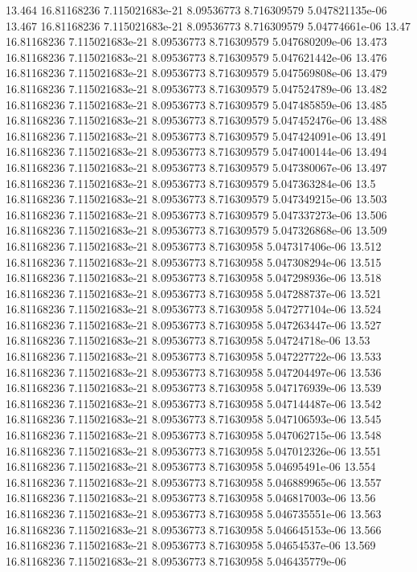 {13.464 16.81168236 7.115021683e-21 8.09536773 8.716309579 5.047821135e-06
13.467 16.81168236 7.115021683e-21 8.09536773 8.716309579 5.04774661e-06
13.47 16.81168236 7.115021683e-21 8.09536773 8.716309579 5.047680209e-06
13.473 16.81168236 7.115021683e-21 8.09536773 8.716309579 5.047621442e-06
13.476 16.81168236 7.115021683e-21 8.09536773 8.716309579 5.047569808e-06
13.479 16.81168236 7.115021683e-21 8.09536773 8.716309579 5.047524789e-06
13.482 16.81168236 7.115021683e-21 8.09536773 8.716309579 5.047485859e-06
13.485 16.81168236 7.115021683e-21 8.09536773 8.716309579 5.047452476e-06
13.488 16.81168236 7.115021683e-21 8.09536773 8.716309579 5.047424091e-06
13.491 16.81168236 7.115021683e-21 8.09536773 8.716309579 5.047400144e-06
13.494 16.81168236 7.115021683e-21 8.09536773 8.716309579 5.047380067e-06
13.497 16.81168236 7.115021683e-21 8.09536773 8.716309579 5.047363284e-06
13.5 16.81168236 7.115021683e-21 8.09536773 8.716309579 5.047349215e-06
13.503 16.81168236 7.115021683e-21 8.09536773 8.716309579 5.047337273e-06
13.506 16.81168236 7.115021683e-21 8.09536773 8.716309579 5.047326868e-06
13.509 16.81168236 7.115021683e-21 8.09536773 8.71630958 5.047317406e-06
13.512 16.81168236 7.115021683e-21 8.09536773 8.71630958 5.047308294e-06
13.515 16.81168236 7.115021683e-21 8.09536773 8.71630958 5.047298936e-06
13.518 16.81168236 7.115021683e-21 8.09536773 8.71630958 5.047288737e-06
13.521 16.81168236 7.115021683e-21 8.09536773 8.71630958 5.047277104e-06
13.524 16.81168236 7.115021683e-21 8.09536773 8.71630958 5.047263447e-06
13.527 16.81168236 7.115021683e-21 8.09536773 8.71630958 5.04724718e-06
13.53 16.81168236 7.115021683e-21 8.09536773 8.71630958 5.047227722e-06
13.533 16.81168236 7.115021683e-21 8.09536773 8.71630958 5.047204497e-06
13.536 16.81168236 7.115021683e-21 8.09536773 8.71630958 5.047176939e-06
13.539 16.81168236 7.115021683e-21 8.09536773 8.71630958 5.047144487e-06
13.542 16.81168236 7.115021683e-21 8.09536773 8.71630958 5.047106593e-06
13.545 16.81168236 7.115021683e-21 8.09536773 8.71630958 5.047062715e-06
13.548 16.81168236 7.115021683e-21 8.09536773 8.71630958 5.047012326e-06
13.551 16.81168236 7.115021683e-21 8.09536773 8.71630958 5.04695491e-06
13.554 16.81168236 7.115021683e-21 8.09536773 8.71630958 5.046889965e-06
13.557 16.81168236 7.115021683e-21 8.09536773 8.71630958 5.046817003e-06
13.56 16.81168236 7.115021683e-21 8.09536773 8.71630958 5.046735551e-06
13.563 16.81168236 7.115021683e-21 8.09536773 8.71630958 5.046645153e-06
13.566 16.81168236 7.115021683e-21 8.09536773 8.71630958 5.04654537e-06
13.569 16.81168236 7.115021683e-21 8.09536773 8.71630958 5.046435779e-06
}
